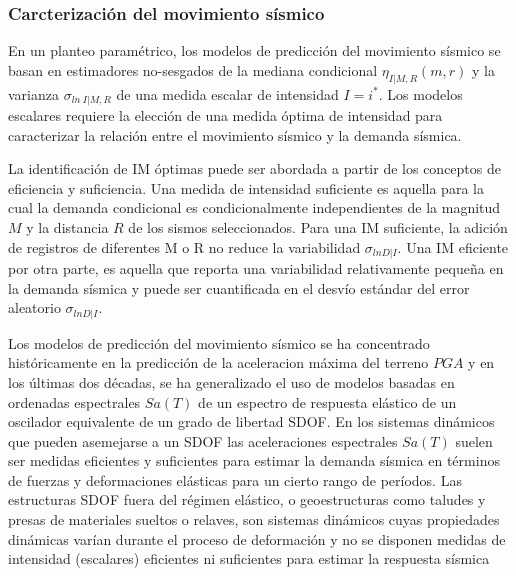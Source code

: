 \documentclass[
]{krantz}
\begin{document}
\hypertarget{carcterizaciuxf3n-del-movimiento-suxedsmico}{%
\subsubsection*{Carcterización del movimiento sísmico}\label{carcterizaciuxf3n-del-movimiento-suxedsmico}}

En un planteo paramétrico, los modelos de predicción del movimiento sísmico se basan en estimadores no-sesgados de la mediana condicional \(\eta_{I|M,R}(m,r)\) y la varianza \(\sigma_{ln \ I|M,R}\) de una medida escalar de intensidad \(I=i^*\). Los modelos escalares requiere la elección de una medida óptima de intensidad para caracterizar la relación entre el movimiento sísmico y la demanda sísmica.

La identificación de IM óptimas puede ser abordada a partir de los conceptos de eficiencia y suficiencia. Una medida de intensidad suficiente es aquella para la cual la demanda condicional es condicionalmente independientes de la magnitud \(M\) y la distancia \(R\) de los sismos seleccionados. Para una IM suficiente, la adición de registros de diferentes M o R no reduce la variabilidad \(\sigma_{ln D|I}\). Una IM eficiente por otra parte, es aquella que reporta una variabilidad relativamente pequeña en la demanda sísmica y puede ser cuantificada en el desvío estándar del error aleatorio \(\sigma_{ln D|I}\).

Los modelos de predicción del movimiento sísmico se ha concentrado históricamente en la predicción de la aceleracion máxima del terreno \(PGA\) y en los últimas dos décadas, se ha generalizado el uso de modelos basadas en ordenadas espectrales \(Sa(T)\) de un espectro de respuesta elástico de un oscilador equivalente de un grado de libertad SDOF. En los sistemas dinámicos que pueden asemejarse a un SDOF las aceleraciones espectrales \(Sa(T)\) suelen ser medidas eficientes y suficientes para estimar la demanda sísmica en términos de fuerzas y deformaciones elásticas para un cierto rango de períodos. Las estructuras SDOF fuera del régimen elástico, o geoestructuras como taludes y presas de materiales sueltos o relaves, son sistemas dinámicos cuyas propiedades dinámicas varían durante el proceso de deformación y no se disponen medidas de intensidad (escalares) eficientes ni suficientes para estimar la respuesta sísmica
\end{document}
